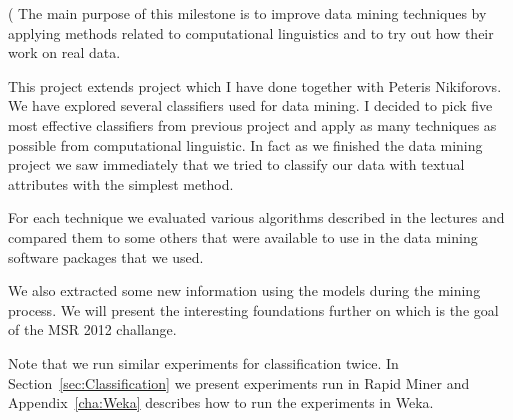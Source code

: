(
The main purpose of this milestone is to improve data mining techniques by applying
methods related to computational linguistics and to try out how their work on real data.

This project extends project which I have done together with Peteris Nikiforovs. 
We have explored several classifiers used for data mining.
I decided to pick five most effective classifiers from previous project and apply 
as many techniques as possible from computational linguistic. 
In fact as we finished the data mining project we saw immediately that
we tried to classify our data with textual attributes with the simplest method.

For each technique we evaluated various algorithms described in the lectures and compared them to some others that were available to use in the data mining software packages that we used. 

We also extracted some new information using the models during the mining process. We will present the interesting foundations further on which is the goal of the MSR 2012 challange.

Note that we run similar experiments for classification twice. In Section~\ref{sec:Classification} we present experiments run in Rapid Miner and Appendix~\ref{cha:Weka} describes how to run the experiments in Weka.
